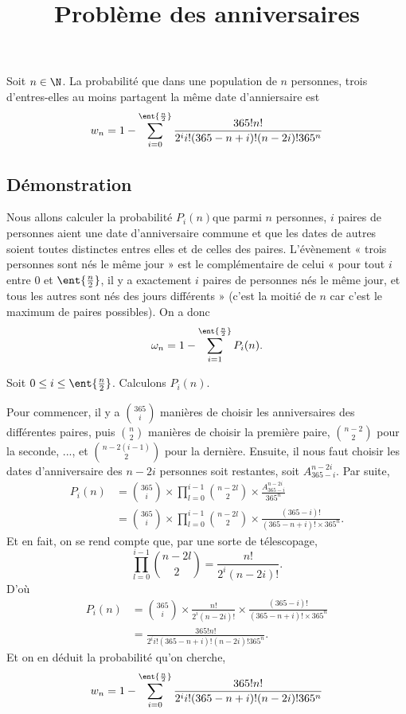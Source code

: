\documentclass[fontsize=12pt,twoside=false,parskip=half, french]{scrartcl}
\title{Problème des anniversaires}
\date{}
\author{}
\begin{document}
\maketitle
   \begin{Theoreme}
      Soit $n \in \N$. La probabilité que dans une population de $n$ personnes,
      trois d’entres-elles au moins partagent la même date d’anniersaire est
      \[
            w_n = 1 - \sum_{i = 0}^{\ent{\frac{n}{2}}} \frac{365!n!}{2^i i! (365 - n + i)! (n - 2i)! 365^n}
      \]
   \end{Theoreme}
   \subsection{Démonstration}
      Nous allons calculer la probabilité $P_i(n) $que parmi $n$ personnes,
         $i$ paires de personnes aient une date d’anniversaire commune et que les dates de autres soient toutes distinctes entres elles et de celles des paires. L’évènement « trois personnes sont nés le même jour » est le complémentaire de celui « pour tout $i$ entre $0$ et $\ent{\frac{n}{2}}$,
         il y a exactement $i$ paires de personnes nés le même jour, et tous les
         autres sont nés des jours différents » (c’est la moitié de $n$ car
         c’est le maximum de paires possibles). On a donc
         \[
            \omega_n = 1 - \sum_{i = 1}^{\ent{\frac{n}{2}}} P_i(n). 
         \]
         
         Soit $0 \leq i \leq \ent{\frac{n}{2}}$. Calculons $P_i(n)$.
         
         Pour commencer, il y a $\binom{365}{i}$ manières de choisir les anniversaires des différentes paires, puis $\binom{n}{2}$ manières de choisir la première
         paire, $\binom{n - 2}{2}$ pour la seconde, ..., et $\binom{n - 2(i - 1)}{2}$
         pour la dernière. 
         Ensuite, il nous faut choisir les dates d’anniversaire des $n - 2i$ personnes
         soit restantes, soit $A^{n - 2i}_{365 - i}$. Par suite,
         \begin{align*}
           P_i(n) &= \binom{365}{i} \times \prod_{l = 0}^{i - 1} \binom{n - 2l}{2} \times \frac{A^{n - 2i}_{365 - i}}{365^n}\\
           &=  \binom{365}{i} \times \prod_{l = 0}^{i - 1} \binom{n - 2l}{2} \times 
              \frac{(365 - i)!}{(365 - n + i)! \times 365^n}. 
         \end{align*}
         Et en fait, on se rend compte que, par une sorte de télescopage, 
         \[
            \prod_{l = 0}^{i - 1} \binom{n - 2l}{2} = \frac{n!}{2^i(n - 2i)!}.
         \]
         D’où
         \begin{align*}
            P_i(n) &= \binom{365}{i} \times \frac{n!}{2^i(n - 2i)!} \times 
                                        \frac{(365 - i)!}{(365 - n + i)! \times 365^n}\\
                &= \frac{365!n!}{2^i i! (365 - n + i)! (n - 2i)! 365^n}.
         \end{align*}
         Et on en déduit la probabilité qu’on cherche,
         \[
            w_n = 1 - \sum_{i = 0}^{\ent{\frac{n}{2}}} \frac{365!n!}{2^i i! (365 - n + i)! (n - 2i)! 365^n}
         \]
      
\end{document}
